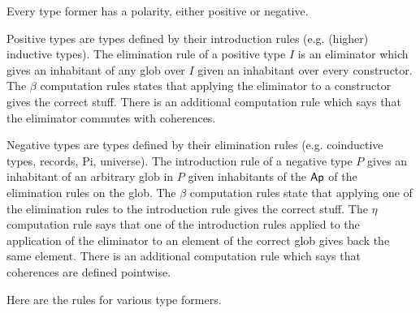 Every type former has a polarity, either positive or negative.

Positive types are types defined by their introduction rules (e.g. (higher)
inductive types). The elimination rule of a positive type $I$ is an eliminator
which gives an inhabitant of any glob over $I$ given an inhabitant over every
constructor. The $\beta$ computation rules states that applying the eliminator
to a constructor gives the correct stuff. There is an additional computation
rule which says that the eliminator commutes with coherences.  

Negative types are types defined by their elimination rules (e.g. coinductive
types, records, Pi, universe). The introduction rule of a negative type $P$
gives an inhabitant of an arbitrary glob in $P$ given inhabitants of the
$\mathsf{Ap}$ of the elimination rules on the glob. The $\beta$ computation rules
state that applying one of the elimination rules to the introduction rule gives
the correct stuff. The $\eta$ computation rule says that one of the introduction
rules applied to the application of the eliminator to an element of the correct
glob gives back the same element. There is an additional computation rule which
says that coherences are defined pointwise.

Here are the rules for various type formers.

